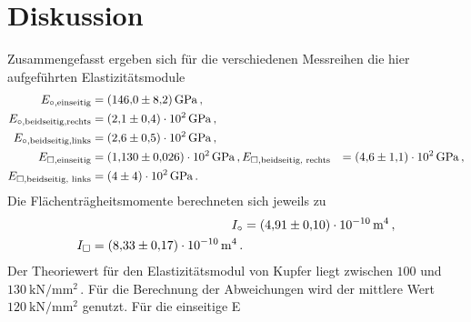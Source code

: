 \section{Diskussion}
\label{sec:Diskussion}
Zusammengefasst ergeben sich für die verschiedenen Messreihen die hier aufgeführten 
Elastizitätsmodule
\begin{align*}
    E_{\circ,\text{einseitig}}&=\qty{146(8,2)}{\giga\pascal}\,,\\
    E_{\circ,\text{beidseitig,rechts}}&=\qty{2.1(0.4)e2}{\giga\pascal}\,,\\
    E_{\circ,\text{beidseitig,links}}&=\qty{2.6(0.5)e2}{\giga\pascal}\,,\\
    E_{\square,\text{einseitig}}&=\qty{1,13(0.026)e2}{\giga\pascal}\,,
    E_{\square,\text{beidseitig, rechts}}&=\qty{4.6(1.1)e2}{\giga\pascal}\,,\\
    E_{\square,\text{beidseitig, links}}&=\qty{4(4)e2}{\giga\pascal}\,.\\
\end{align*}
Die Flächenträgheitsmomente berechneten sich jeweils zu 
\begin{align*}
    I_\circ&=\qty{4,91(0.10)e-10}{\meter\tothe{4}}\,,\\
    I_\square=\qty{8,33(0,17)e-10}{\meter\tothe{4}}\,.
\end{align*}
Der Theoriewert für den Elastizitätsmodul von Kupfer liegt zwischen $100$ und $\qty{130}{\kilo\newton\per\milli\meter\squared}$\,.
Für die Berechnung der Abweichungen wird der mittlere Wert $\qty{120}{\kilo\newton\per\milli\meter\squared}$ genutzt.
Für die einseitige E